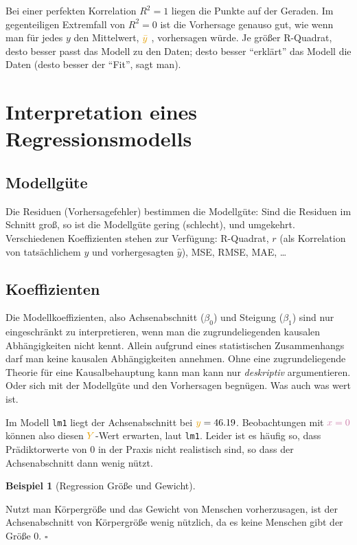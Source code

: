 \documentclass[
  letterpaper,
  twoside,
  open=any]{scrbook}
\theoremstyle{definition}
\theoremstyle{definition}
\theoremstyle{definition}
\newtheorem{example}{Beispiel}[chapter]
\theoremstyle{remark}
\begin{document}
Bei einer perfekten Korrelation \(R^2=1\) liegen die Punkte auf der
Geraden. Im gegenteiligen Extremfall von \(R^2=0\) ist die Vorhersage
genauso gut, wie wenn man für jedes \(y\) den Mittelwert,
{\(\color{ycol}{\bar{y}}\)} , vorhersagen würde. Je größer R-Quadrat,
desto besser passt das Modell zu den Daten; desto besser
\enquote{erklärt} das Modell die Daten (desto besser der \enquote{Fit},
sagt man).

\section{Interpretation eines
Regressionsmodells}\label{sec-interpret-reg-mod}

\subsection{Modellgüte}\label{modellguxfcte-1}

Die Residuen (Vorhersagefehler) bestimmen die Modellgüte: Sind die
Residuen im Schnitt groß, so ist die Modellgüte gering (schlecht), und
umgekehrt. Verschiedenen Koeffizienten stehen zur Verfügung: R-Quadrat,
\(r\) (als Korrelation von tatsächlichem \(y\) und vorhergesagten
\(\hat{y}\)), MSE, RMSE, MAE, \ldots{}

\subsection{Koeffizienten}\label{koeffizienten}

Die Modellkoeffizienten, also Achsenabschnitt (\(\beta_0\)) und Steigung
(\(\beta_1\)) sind nur eingeschränkt zu interpretieren, wenn man die
zugrundeliegenden kausalen Abhängigkeiten nicht kennt. Allein aufgrund
eines statistischen Zusammenhangs darf man keine kausalen Abhängigkeiten
annehmen. Ohne eine zugrundeliegende Theorie für eine Kausalbehauptung
kann man kann nur \emph{deskriptiv} argumentieren. Oder sich mit der
Modellgüte und den Vorhersagen begnügen. Was auch was wert ist.

{Im Modell \texttt{lm1} liegt der Achsenabschnitt bei
\(\textcolor{ycol}{y}=46.19\). Beobachtungen mit \(\color{xcol}{x}=0\)
können also diesen \(\textcolor{ycol}{Y}\)-Wert erwarten, laut
\texttt{lm1}.} Leider ist es häufig so, dass Prädiktorwerte von 0 in der
Praxis nicht realistisch sind, so dass der Achsenabschnitt dann wenig
nützt.

\begin{example}[Regression Größe und
Gewicht]\protect\hypertarget{exm-groesse}{}\label{exm-groesse}

Nutzt man Körpergröße und das Gewicht von Menschen vorherzusagen, ist
der Achsenabschnitt von Körpergröße wenig nützlich, da es keine Menschen
gibt der Größe 0. \(\square\)

\end{example}
\end{document}
